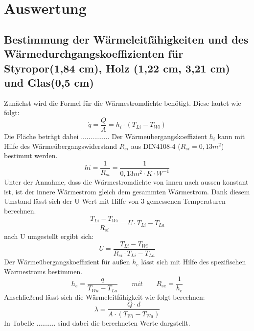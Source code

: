 \section{Auswertung}
\subsection{Bestimmung der Wärmeleitfähigkeiten und des Wärmedurchgangskoeffizienten für Styropor(1,84 cm), Holz (1,22 cm, 3,21 cm) und  Glas(0,5 cm)}
Zunächst wird die Formel für die Wärmestromdichte benötigt. Diese lautet wie folgt:
\begin{equation}
\dot q=\frac{ Q }{ A }=h_{ i }\cdot(T_{ Li }-T_{Wi })
  \label{eq:230514_Wärmestromdichte}
\end{equation}
Die Fläche beträgt dabei ............... Der Wärmeübergangskoeffizient $h_{i}$ kann mit Hilfe des Wärmeübergangswiderstand $R_{si}$ aus DIN4108-4 ($R_{si}=0,13 m^2$) bestimmt werden.
\begin{equation}
hi=\frac{ 1 }{ R_{ si } }=\frac{ 1 }{ 0,13m^2\cdot K \cdot W^{-1} }
  \label{eq:230514_Wärmeübergangskoeffizient}
\end{equation}
Unter der Annahme, dass die Wärmestromdichte von innen nach aussen konstant ist, ist der innere Wärmestrom gleich dem gesammten Wärmestrom. Dank diesem Umstand lässt sich der U-Wert mit Hilfe von 3 gemessenen Temperaturen berechnen.
\begin{equation}
\frac{ T_{Li} - T_{Wi}}{ R_{ si } }=U \cdot T_{Li} - T_{La}
  \label{eq:230514_u1}
\end{equation}
nach U umgestellt ergibt sich: 
\begin{equation}
U = \frac{ T_{Li} - T_{Wi}}{ R_{ si } \cdot  T_{Li} - T_{La}}
  \label{eq:230514_u2}
\end{equation}
Der Wärmeübergangskoeffizient für außen $h_{e}$ lässt sich mit Hilfe des spezifischen Wärmestroms bestimmen. 
\begin{equation}
h_{e}=\frac{ q }{ T_{Wa} - T_{La} }   \qquad  mit     \qquad       R_{se}=\frac{ 1 }{ h_{e} }
  \label{eq:230514_h_e}
\end{equation}
Anschließend lässt sich die Wärmeleitfähigkeit wie folgt berechnen:
\begin{equation}
\lambda=\frac{ Q \cdot d }{ A \cdot ( T_{Wi} - T_{Wa} )}
  \label{eq:230514_lamda}
\end{equation}
In Tabelle ..........  sind dabei die berechneten Werte dargstellt.
